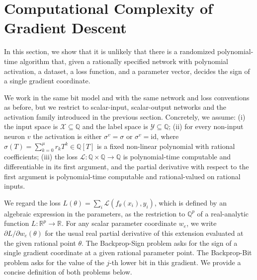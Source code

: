 \documentclass{article}
\newcommand{\cL}{\mathcal{L}}
\newcommand{\cX}{\mathcal{X}}
\newcommand{\cY}{\mathcal{Y}}
\theoremstyle{plain}
\theoremstyle{definition}
\theoremstyle{remark}
\begin{document}
\section{Computational Complexity of Gradient Descent}
\label{sec:backprop}
In this section, we show that it is unlikely that there is a randomized polynomial-time
algorithm that, given a rationally specified network with polynomial activation, a dataset, a loss function, and a
parameter vector, decides the sign of a single gradient coordinate. 

We work in the same bit model and with the same network
and loss conventions as before, but we restrict to scalar-input,
scalar-output networks and the activation family introduced in the
previous section. 
Concretely, we assume:
(i) the input space is $\cX\subseteq\mathbb{Q}$ and the label space is
$\cY\subseteq\mathbb{Q}$;
(ii) for every non-input neuron $v$ the activation is either
$\sigma^v=\sigma$ or $\sigma^v=\mathrm{id}$, where
$\sigma(T)=\sum_{k=0}^{\mu} r_k T^k\in\mathbb{Q}[T]$ is a fixed non-linear
polynomial with rational coefficients;
(iii) the loss $\cL:\mathbb{Q}\times\mathbb{Q}\to\mathbb{Q}$ is
polynomial-time computable and differentiable in its first argument, and
the partial derivative with respect to the first argument is
polynomial-time computable and rational-valued on rational inputs.

We regard the loss $L(\theta)=\sum_i \cL(f_\theta(x_i),y_i)$, which is
defined by an algebraic expression in the parameters, as the restriction
to $\mathbb{Q}^p$ of a real-analytic function $L:\mathbb{R}^p\to\mathbb{R}$.
For any scalar parameter coordinate $w_e$, we write
$\partial L/\partial w_e(\theta)$ for the usual real partial derivative
of this extension evaluated at the given rational point $\theta$.
 The Backprop-Sign problem asks for the sign of a single gradient coordinate at
 a given rational parameter point.  The Backprop-Bit problem asks for the value of the $j$-th lower bit in this gradient. We provide a concise definition of both problems below. 
\end{document}
